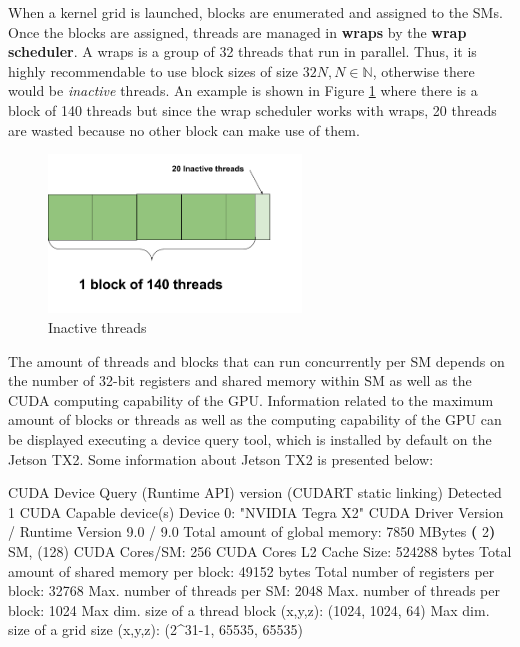 \documentclass[
  12pt,
  a4paperpaper,
]{report}
\newenvironment{Shaded}{}{}
\newcommand{\BuiltInTok}[1]{#1}
\newcommand{\ExtensionTok}[1]{#1}
\newcommand{\KeywordTok}[1]{\textcolor[rgb]{0.00,0.44,0.13}{\textbf{#1}}}
\newcommand{\NormalTok}[1]{#1}
\newcommand{\StringTok}[1]{\textcolor[rgb]{0.25,0.44,0.63}{#1}}
\begin{document}
When a kernel grid is launched, blocks are enumerated and assigned to the
SMs. Once the blocks are assigned, threads are managed in \textbf{wraps}
by the \textbf{wrap scheduler}. A wraps is a group of 32 threads that
run in parallel. Thus, it is highly recommendable to use block sizes of
size \(32N, N \in \mathbb{N}\), otherwise there would be \textit{inactive}
threads. An example is shown in Figure \ref{img:inactive_thread} where
there is a block of 140 threads but since the wrap scheduler works with
wraps, 20 threads are wasted because no other block can make use of them.

\begin{figure}
\centering
\includegraphics[width=0.6\textwidth,height=\textheight]{source/figures/inactive_thread.png}
\caption{Inactive threads \label{img:inactive_thread}}
\end{figure}

The amount of threads and blocks that can run concurrently per SM
depends on the number of 32-bit registers and shared memory within SM
as well as the CUDA computing capability of the GPU. Information related
to the maximum amount of blocks or threads as well as the computing
capability of the GPU can be displayed executing a device query
tool, which is installed by default on the Jetson TX2. 
Some information about Jetson TX2 is presented below:

\begin{Shaded}
\begin{Highlighting}[]
\ExtensionTok{CUDA}\NormalTok{ Device Query (Runtime API) }\ExtensionTok{version}\NormalTok{ (CUDART static linking)}
\ExtensionTok{Detected}\NormalTok{ 1 CUDA Capable device(s)}
\ExtensionTok{Device}\NormalTok{ 0: }\StringTok{"NVIDIA Tegra X2"}
  \ExtensionTok{CUDA}\NormalTok{ Driver Version / Runtime Version     9.0 / 9.0}
  \ExtensionTok{Total}\NormalTok{ amount of global memory:            7850 MBytes }
  \KeywordTok{(} \ExtensionTok{2}\KeywordTok{)} \ExtensionTok{SM}\NormalTok{, (128) }\ExtensionTok{CUDA}\NormalTok{ Cores/SM:             256 CUDA Cores}
  \ExtensionTok{L2}\NormalTok{ Cache Size:                            524288 bytes}
  \ExtensionTok{Total}\NormalTok{ amount of shared memory per block:  49152 bytes}
  \ExtensionTok{Total}\NormalTok{ number of registers per block:      32768}
  \ExtensionTok{Max.}\NormalTok{ number of threads per SM:            2048}
  \ExtensionTok{Max.}\NormalTok{ number of threads per block:         1024}
  \ExtensionTok{Max}\NormalTok{ dim. size of a thread block (x,y,z)}\BuiltInTok{:}\NormalTok{  (1024, 1024, 64)}
  \ExtensionTok{Max}\NormalTok{ dim. size of a grid size    (x,y,z)}\BuiltInTok{:}\NormalTok{  (2\^{}31{-}1, 65535, 65535)}
\end{Highlighting}
\end{Shaded}
\end{document}
